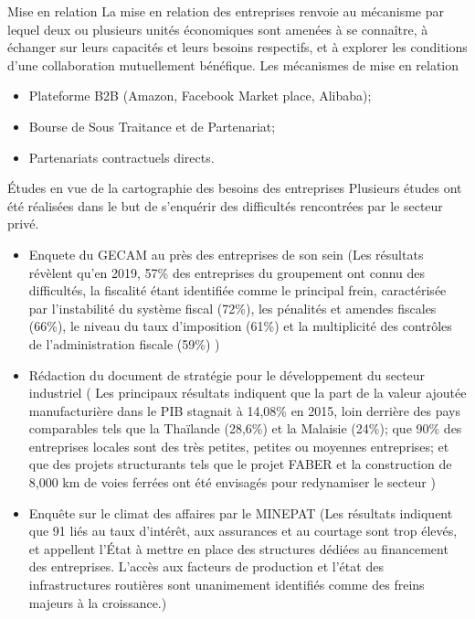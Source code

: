 \documentclass[aspectratio=169, 10pt]{beamer}
\begin{document}
\begin{frame}{Mise en relation}
	La mise en relation des entreprises renvoie au mécanisme par lequel deux ou plusieurs
	unités économiques sont amenées à se connaître, à échanger sur leurs capacités et leurs
	besoins respectifs, et à explorer les conditions d’une collaboration mutuellement bénéfique.
	Les mécanismes de mise en relation
	\begin{itemize}
		\item Plateforme B2B (Amazon, Facebook Market place, Alibaba);
		\item Bourse de Sous Traitance et de Partenariat;
		\item Partenariats contractuels directs.
	\end{itemize}
\end{frame}
\begin{frame}{Études en vue de la cartographie des besoins des entreprises}
	Plusieurs études ont été réalisées dans le but de s'enquérir des difficultés rencontrées par le secteur privé.
	\begin{itemize}
		\item Enquete du GECAM au près des entreprises de son sein (Les résultats révèlent qu’en
		2019, 57\% des entreprises du groupement ont connu des difficultés, la fiscalité étant identifiée
		comme le principal frein, caractérisée par l’instabilité du système fiscal (72\%), les pénalités et
		amendes fiscales (66\%), le niveau du taux d’imposition (61\%) et la multiplicité des contrôles
		de l’administration fiscale (59\%) )
		\item Rédaction du document de stratégie pour le développement du secteur industriel ( Les principaux résultats
		indiquent que la part de la valeur ajoutée manufacturière dans le PIB stagnait à 14,08\% en
		2015, loin derrière des pays comparables tels que la Thaïlande (28,6\%) et la Malaisie (24\%);
		que 90\% des entreprises locales sont des très petites, petites ou moyennes entreprises; et que
		des projets structurants tels que le projet FABER et la construction de 8,000 km de voies
		ferrées ont été envisagés pour redynamiser le secteur )
		\item Enqu\^ete sur le climat des affaires par le MINEPAT (Les résultats indiquent que 91%
		liés au taux d’intérêt, aux assurances et au courtage sont trop élevés, et appellent l’État à
		mettre en place des structures dédiées au financement des entreprises. L’accès aux facteurs
		de production et l’état des infrastructures routières sont unanimement identifiés comme des
		freins majeurs à la croissance.)
	\end{itemize}
\end{frame}
\end{document}
